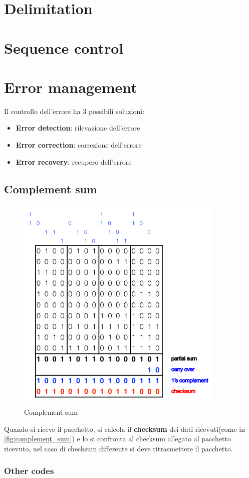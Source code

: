 \section{Delimitation}
\section{Sequence control}
\section{Error management}

Il controllo dell'errore ha 3 possibili soluzioni:
\begin{itemize}
	\item \textbf{Error detection}: rilevazione dell'errore
	\item \textbf{Error correction}: correzione dell'errore
	\item \textbf{Error recovery}: recupero dell'errore
\end{itemize}

\subsection{Complement sum}

\begin{figure}[!ht]
	\centering
	\includegraphics[width=0.4\columnwidth]{./images/complement_sum.png}
	\caption{Complement sum}
	\label{fig:complement_sum}
\end{figure}

Quando si riceve il pacchetto, si calcola il \textbf{checksum} dei dati ricevuti(come in \autoref{fig:complement_sum})
e lo si confronta al checksum allegato al pacchetto ricevuto,
nel caso di checksum differente si deve ritrasmettere il pacchetto.

\subsubsection{Other codes}


